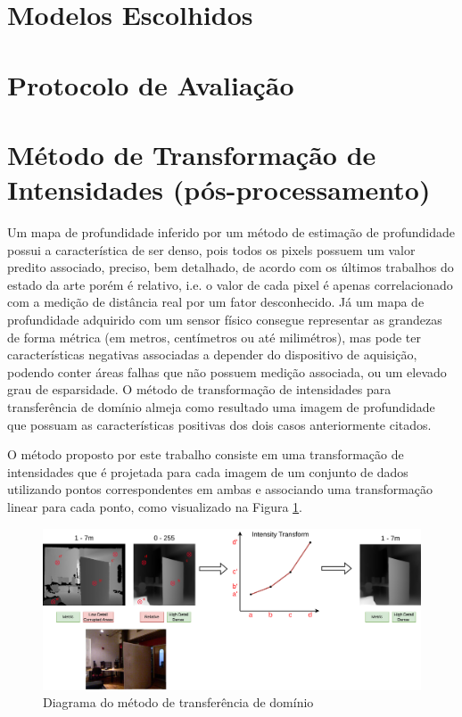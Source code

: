 \section{Modelos Escolhidos}

\section{Protocolo de Avaliação}

\section{Método de Transformação de Intensidades (pós-processamento)}

Um mapa de profundidade inferido por um método de estimação de profundidade possui a característica de ser denso, pois todos os pixels possuem um valor predito associado, preciso, bem detalhado, de acordo com os últimos trabalhos do estado da arte porém é relativo, i.e. o valor de cada pixel é apenas correlacionado com a medição de distância real por um fator desconhecido. Já um mapa de profundidade adquirido com um sensor físico consegue representar as grandezas de forma métrica (em metros, centímetros ou até milimétros), mas pode ter características negativas associadas a depender do dispositivo de aquisição, podendo conter áreas falhas que não possuem medição associada, ou um elevado grau de esparsidade. O método de transformação de intensidades para transferência de domínio almeja como resultado uma imagem de profundidade que possuam as características positivas dos dois casos anteriormente citados. 

O método proposto por este trabalho consiste em uma transformação de intensidades que é projetada para cada imagem de um conjunto de dados utilizando pontos correspondentes em ambas e associando uma transformação linear para cada ponto, como visualizado na Figura \ref{posproc}. 


\begin{figure}[h]
    \centering
    \includegraphics[width=\textwidth]{fig/diagram_normalization_white.png}
    \caption{Diagrama do método de transferência de domínio}
    \label{posproc}
\end{figure}

